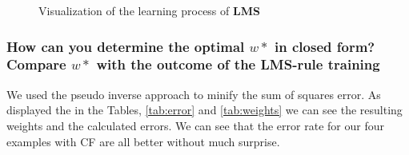 \begin{figure}[!h]
\begin{center}
\centering
{}
\end{center}
\caption{\label{fig:lms} Visualization of the learning process of \textbf{LMS}}
\end{figure}



\subsubsection{How can you determine the optimal $w*$ in closed form?  Compare $w*$ with the outcome of the {LMS}-rule training}

We used the pseudo inverse approach to minify the sum of squares error. As displayed the in the Tables, \ref{tab:error} and \ref{tab:weights} we can see the resulting weights and the calculated errors. We can see that the error rate for our four examples with CF are all better without much surprise.


